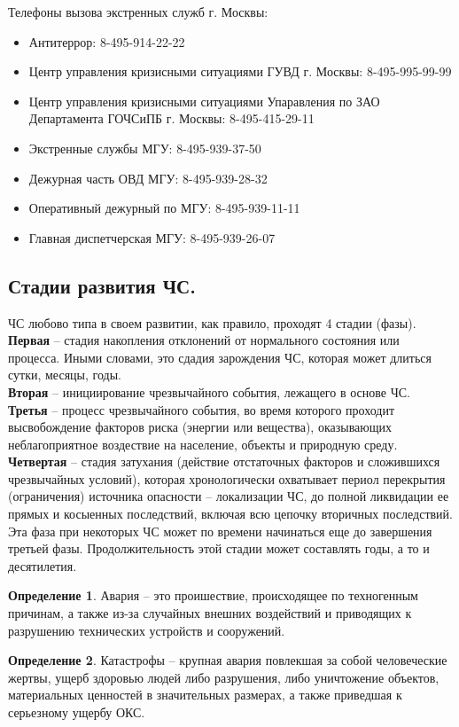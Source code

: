 \documentclass[a4paper, 12pt]{article}
\theoremstyle{definition}
\newtheorem*{definition}{Определение}
\begin{document}
        Телефоны вызова экстренных служб г. Москвы:
        \begin{itemize}
            \item Антитеррор: 8-495-914-22-22
            \item Центр управления кризисными ситуациями ГУВД г. Москвы: 8-495-995-99-99
            \item Центр управления кризисными ситуациями Упаравления по ЗАО Департамента ГОЧСиПБ г. Москвы: 8-495-415-29-11
            \item Экстренные службы МГУ: 8-495-939-37-50
            \item Дежурная часть ОВД МГУ: 8-495-939-28-32
            \item Оперативный дежурный по МГУ: 8-495-939-11-11
            \item Главная диспетчерская МГУ: 8-495-939-26-07
        \end{itemize}
        \subsection{Стадии развития ЧС.}
        ЧС любово типа в своем развитии, как правило, проходят 4 стадии (фазы).\\
        \textbf{Первая} -- стадия накопления отклонений от нормального состояния или процесса. Иными словами, это сдадия зарождения ЧС, которая может длиться сутки, месяцы, годы.\\
        \textbf{Вторая} -- инициирование чрезвычайного события, лежащего в основе ЧС.\\
        \textbf{Третья} -- процесс чрезвычайного события, во время которого проходит высвобождение факторов риска (энергии или вещества), оказывающих неблагоприятное воздествие на население, объекты и природную среду.\\
        \textbf{Четвертая} -- стадия затухания (действие отстаточных факторов и сложившихся чрезвычайных условий), которая хронологически охватывает периол перекрытия (ограничения) источника опасности -- локализации ЧС, до полной ликвидации ее прямых и косыенных последствий, включая всю цепочку вторичных последствий. Эта фаза при некоторых ЧС может по времени начинаться еще до завершения третьей фазы. Продолжительность этой стадии может составлять годы, а то и десятилетия. 
        \begin{definition}
            Авария -- это проишествие, происходящее по техногенным причинам, а также из-за случайных внешних воздействий и приводящих к разрушению технических устройств и сооружений.
        \end{definition}
        \begin{definition}
            Катастрофы -- крупная авария повлекшая за собой человеческие жертвы, ущерб здоровью людей либо разрушения, либо уничтожение объектов, материальных ценностей в значительных размерах, а также приведшая к серьезному ущербу ОКС.
        \end{definition}
\end{document}
